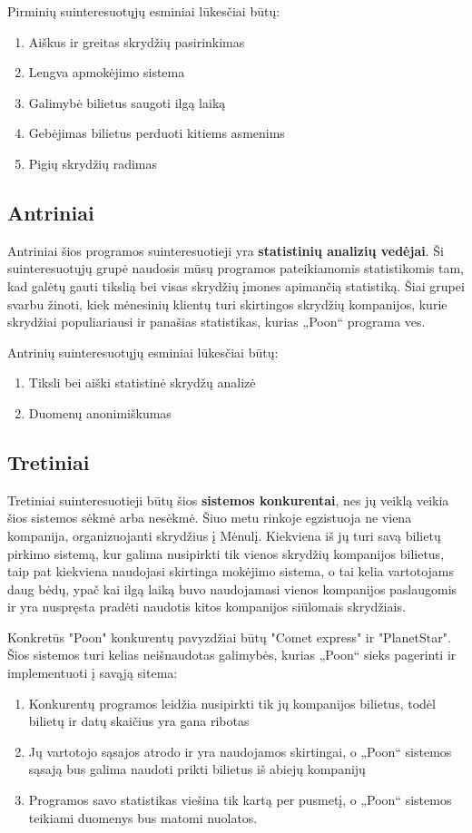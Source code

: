 \documentclass{VUMIFPSkursinis}
\begin{document}
Pirminių suinteresuotųjų esminiai lūkesčiai būtų:
\begin{enumerate}
\item Aiškus ir greitas skrydžių pasirinkimas \label{itm:aisku}
\item Lengva apmokėjimo sistema\label{itm:apmokejimas}
\item Galimybė bilietus saugoti ilgą laiką\label{itm:saugoti}
\item Gebėjimas bilietus perduoti kitiems asmenims\label{itm:perduoti}
\item Pigių skrydžių radimas\label{itm:pigu}
\end{enumerate}

\subsection{Antriniai} 
Antriniai šios programos suinteresuotieji yra \textbf{statistinių analizių vedėjai}. Ši suinteresuotųjų grupė naudosis mūsų programos pateikiamomis statistikomis tam, kad galėtų gauti tikslią bei visas skrydžių įmones apimančią statistiką. Šiai grupei svarbu žinoti, kiek mėnesinių klientų turi skirtingos skrydžių kompanijos, kurie skrydžiai populiariausi ir panašias statistikas, kurias „Poon“ programa ves.

Antrinių suinteresuotųjų esminiai lūkesčiai būtų:
\begin{enumerate}
\item Tiksli bei aiški statistinė skrydžų analizė\label{itm:analize}
\item Duomenų anonimiškumas\label{itm:anonim}
\end{enumerate}

\subsection{Tretiniai} Tretiniai suinteresuotieji būtų šios \textbf{sistemos konkurentai}, nes jų veiklą veikia šios sistemos sėkmė arba nesėkmė. Šiuo metu rinkoje egzistuoja ne viena kompanija, organizuojanti skrydžius į Mėnulį. Kiekviena iš jų turi savą bilietų pirkimo sistemą, kur galima nusipirkti tik vienos skrydžių kompanijos bilietus, taip pat kiekviena naudojasi skirtinga mokėjimo sistema, o tai kelia vartotojams daug bėdų, ypač kai ilgą laiką buvo naudojamasi vienos kompanijos paslaugomis ir yra nuspręsta pradėti naudotis kitos kompanijos siūlomais skrydžiais. 

Konkretūs "Poon" konkurentų pavyzdžiai būtų "Comet express" ir "PlanetStar". Šios sistemos turi kelias neišnaudotas galimybės, kurias „Poon“ sieks pagerinti ir implementuoti į savąją sitema:
\begin{enumerate}
\item Konkurentų programos leidžia nusipirkti tik jų kompanijos bilietus, todėl bilietų ir datų skaičius yra gana ribotas
\item Jų vartotojo sąsajos atrodo ir yra naudojamos skirtingai, o „Poon“ sistemos sąsają bus galima naudoti prikti bilietus iš abiejų kompanijų
\item Programos savo statistikas viešina tik kartą per pusmetį, o „Poon“ sistemos teikiami duomenys bus matomi nuolatos.
\end{enumerate}
\end{document}
